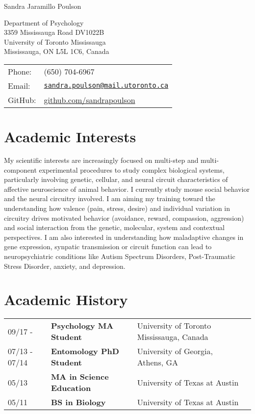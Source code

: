 \documentclass[letterpaper]{article}
\def\name{Sandra Jaramillo Poulson}
\begin{document}
{\huge \name}

\vspace{0.25in}

\begin{minipage}{0.325\linewidth}
  Department of Psychology \\
  3359 Mississauga Road DV1022B \\
  University of Toronto Mississauga\\
  Mississauga, ON L5L 1C6, Canada \\
  \end{minipage}
\begin{minipage}{0.45\linewidth}
  \begin{tabular}{ll}
    Phone:&(650) 704-6967 \\
    Email:&\href{mailto:sandra.poulson@mail.utoronto.ca}{\tt sandra.poulson@mail.utoronto.ca} \\
    GitHub: & \href{https://github.com/sandrapoulson}{github.com/sandrapoulson} \\
  \end{tabular}
\end{minipage}

\section*{Academic Interests}
My scientific interests are increasingly focused on multi-step and multi-component experimental procedures to study complex biological systems, particularly involving genetic, cellular, and neural circuit characteristics of affective neuroscience of animal behavior. I currently study mouse social behavior and the neural circuitry involved. I am aiming my training toward the understanding how valence (pain, stress, desire) and individual variation in circuitry drives motivated behavior (avoidance, reward, compassion, aggression) and social interaction from the genetic, molecular, system and contextual perspectives. I am also interested in understanding how maladaptive changes in gene expression, synpatic transmission or circuit function can lead to neuropsychiatric conditions like Autism Spectrum Disorders, Post-Traumatic Stress Disorder, anxiety, and depression.


\section*{Academic History}

\begin{tabular}{llll}
09/17 - 	& {\bf Psychology MA Student}		& University of Toronto Mississauga, Canada \\
07/13 - 07/14 	& {\bf Entomology PhD Student}		& University of Georgia, Athens, GA \\
05/13         	& {\bf MA in Science Education}	        & University of Texas at Austin \\
05/11         	& {\bf BS in Biology}			& University of Texas at Austin \\
\end{tabular}
\end{document}
